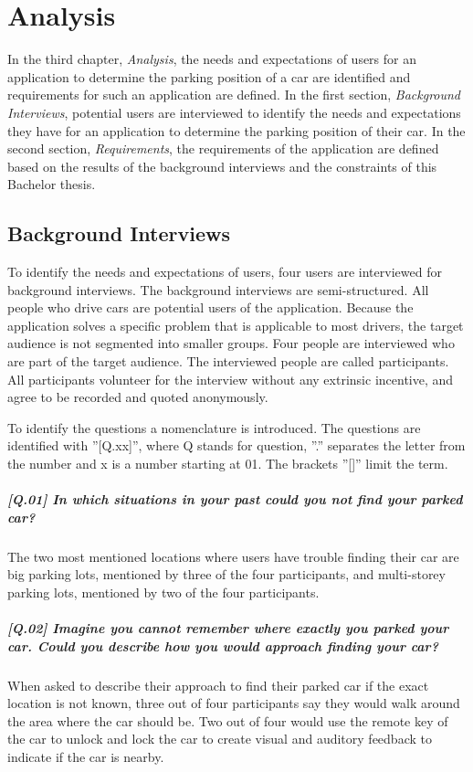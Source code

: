 \chapter{Analysis}
In the third chapter, \textit{Analysis}, the needs and expectations of users for an application to determine the parking position of a car are identified and requirements for such an application are defined.
In the first section, \textit{Background Interviews}, potential users are interviewed to identify the needs and expectations they have for an application to determine the parking position of their car.
In the second section, \textit{Requirements}, the requirements of the application are defined based on the results of the background interviews and the constraints of this Bachelor thesis.

\section{Background Interviews}

To identify the needs and expectations of users, four users are interviewed for background interviews. The background interviews are semi-structured. All people who drive cars are potential users of the application. Because the application solves a specific problem that is applicable to most drivers, the target audience is not segmented into smaller groups. Four people are interviewed who are part of the target audience. The interviewed people are called participants. All participants volunteer for the interview without any extrinsic incentive, and agree to be recorded and quoted anonymously. \cite{Abras2004} \cite{wilson2013interview}

To identify the questions a nomenclature is introduced. The questions are identified with ''[Q.xx]'', where Q stands for question, ''.'' separates the letter from the number and x is a number starting at 01. The brackets ''[]'' limit the term.

\paragraph{[Q.01] In which situations in your past could you not find your parked car?}
The two most mentioned locations where users have trouble finding their car are big parking lots, mentioned by three of the four participants, and multi-storey parking lots, mentioned by two of the four participants.

\paragraph{[Q.02] Imagine you cannot remember where exactly you parked your car. Could you describe how you would approach finding your car?}
When asked to describe their approach to find their parked car if the exact location is not known, three out of four participants say they would walk around the area where the car should be. Two out of four would use the remote key of the car to unlock and lock the car to create visual and auditory feedback to indicate if the car is nearby.

